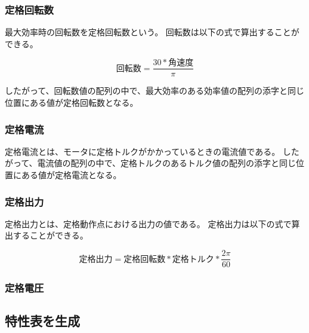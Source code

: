
\subsubsection{定格回転数}\label{sub:sub:teikakukaiten}
最大効率時の回転数を定格回転数という。
回転数は以下の式で算出することができる。

\[
    \mbox{回転数} = \frac{30 * \mbox{角速度}}{\pi}   
\]

したがって、回転数値の配列の中で、最大効率のある効率値の配列の添字と同じ位置にある値が定格回転数となる。


\subsubsection{定格電流}\label{sub:sub:teikakuden}
定格電流とは、モータに定格トルクがかかっているときの電流値である。
したがって、電流値の配列の中で、定格トルクのあるトルク値の配列の添字と同じ位置にある値が定格電流となる。


\subsubsection{定格出力}\label{sub:sub:teikakusyutu}
定格出力とは、定格動作点における出力の値である。
定格出力は以下の式で算出することができる。

\[
    \mbox{定格出力} = \mbox{定格回転数} * \mbox{定格トルク} *  \frac{2\pi}{60}
\]


\subsubsection{定格電圧}\label{sub:sub:teikakudennatu}


\subsection{特性表を生成}\label{sub:seisei_hyou}
